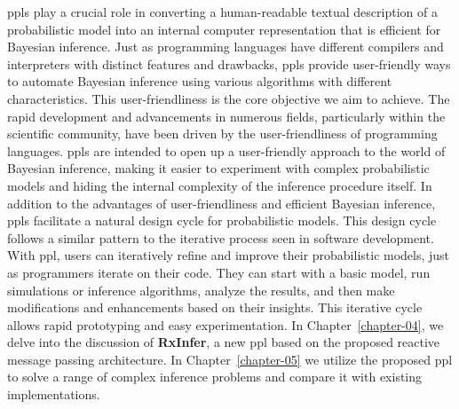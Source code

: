 \Acp{ppl} play a crucial role in converting a human-readable textual description of a probabilistic
model into an internal computer representation that is efficient for Bayesian inference.
Just as programming languages have different compilers and interpreters with distinct
features and drawbacks, \acp{ppl} provide user-friendly ways to automate Bayesian inference using
various algorithms with different characteristics.
This user-friendliness is the core objective we aim to achieve.
The rapid development and advancements in numerous fields, particularly within the scientific
community, have been driven by the user-friendliness of programming languages.
\Acp{ppl} are intended to open up a user-friendly approach to the world of Bayesian inference,
making it easier to experiment with complex probabilistic models and hiding the internal
complexity of the inference procedure itself.
In addition to the advantages of user-friendliness and efficient Bayesian inference, \acp{ppl}
facilitate a natural design cycle for probabilistic models.
This design cycle follows a similar pattern to the iterative process seen in software
development.
With \ac{ppl}, users can iteratively refine and improve their probabilistic models, just as
programmers iterate on their code.
They can start with a basic model, run simulations or inference algorithms, analyze the
results, and then make modifications and enhancements based on their insights.
This iterative cycle allows rapid prototyping and easy experimentation.
In Chapter~\ref{chapter-04}, we delve into the discussion of \textbf{RxInfer}, a new \ac{ppl}
based on the proposed reactive message passing architecture. In Chapter~\ref{chapter-05} we
utilize the proposed \ac{ppl} to solve a range of complex inference problems and compare it
with existing implementations.
